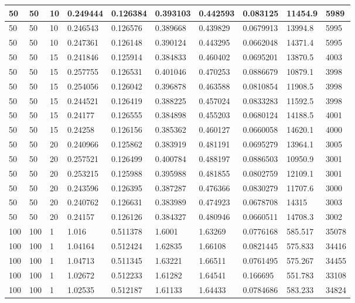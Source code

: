 \begin{landscape}
\begin{longtable}{ | l | l | l | l | l | l | l | l | l | l | }
50 & 50 & 10 & 0.249444 & 0.126384 & 0.393103 & 0.442593 & 0.083125 & 11454.9 & 5989\\ \hline
50 & 50 & 10 & 0.246543 & 0.126576 & 0.389668 & 0.439829 & 0.0679913 & 13994.8 & 5995\\ \hline
50 & 50 & 10 & 0.247361 & 0.126148 & 0.390124 & 0.443295 & 0.0662048 & 14371.4 & 5995\\ \hline
50 & 50 & 15 & 0.241846 & 0.125914 & 0.384833 & 0.460402 & 0.0695201 & 13870.5 & 4003\\ \hline
50 & 50 & 15 & 0.257755 & 0.126531 & 0.401046 & 0.470253 & 0.0886679 & 10879.1 & 3998\\ \hline
50 & 50 & 15 & 0.254056 & 0.126042 & 0.396878 & 0.463588 & 0.0810854 & 11908.5 & 3998\\ \hline
50 & 50 & 15 & 0.244521 & 0.126419 & 0.388225 & 0.457024 & 0.0833283 & 11592.5 & 3998\\ \hline
50 & 50 & 15 & 0.24177 & 0.126555 & 0.384898 & 0.455203 & 0.0680124 & 14188.5 & 4001\\ \hline
50 & 50 & 15 & 0.24258 & 0.126156 & 0.385362 & 0.460127 & 0.0660058 & 14620.1 & 4000\\ \hline
50 & 50 & 20 & 0.240966 & 0.125862 & 0.383919 & 0.481191 & 0.0695279 & 13964.1 & 3005\\ \hline
50 & 50 & 20 & 0.257521 & 0.126499 & 0.400784 & 0.488197 & 0.0886503 & 10950.9 & 3001\\ \hline
50 & 50 & 20 & 0.253215 & 0.125988 & 0.395988 & 0.481855 & 0.0802759 & 12109.1 & 3001\\ \hline
50 & 50 & 20 & 0.243596 & 0.126395 & 0.387287 & 0.476366 & 0.0830279 & 11707.6 & 3000\\ \hline
50 & 50 & 20 & 0.240762 & 0.126631 & 0.383989 & 0.474923 & 0.0678708 & 14315 & 3003\\ \hline
50 & 50 & 20 & 0.24157 & 0.126126 & 0.384327 & 0.480946 & 0.0660511 & 14708.3 & 3002\\ \hline
100 & 100 & 1 & 1.016 & 0.511378 & 1.6001 & 1.63269 & 0.0776168 & 585.517 & 35078\\ \hline
100 & 100 & 1 & 1.04164 & 0.512424 & 1.62835 & 1.66108 & 0.0821445 & 575.833 & 34416\\ \hline
100 & 100 & 1 & 1.04713 & 0.511345 & 1.63221 & 1.66511 & 0.0761495 & 575.267 & 34455\\ \hline
100 & 100 & 1 & 1.02672 & 0.512233 & 1.61282 & 1.64541 & 0.166695 & 551.783 & 33108\\ \hline
100 & 100 & 1 & 1.02535 & 0.512187 & 1.61133 & 1.64433 & 0.0784686 & 583.233 & 34824\\ \hline

\end{longtable}
\end{landscape}
